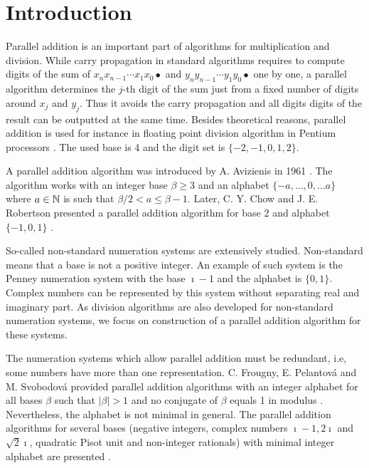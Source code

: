 \cleardoublepage{}
{}
\chapter*{Introduction}

Parallel addition  is an important part of algorithms for multiplication and division. 
While carry propagation in standard algorithms requires to compute digits of the sum of $x_n x_{n-1}\cdots x_1 x_0 \bullet$ and $y_n y_{n-1}\cdots y_1 y_0 \bullet$  one by one, a parallel algorithm determines the $j$-th digit of the sum just from a fixed number of digits around $x_j$ and $y_j$. Thus it avoids the carry propagation  and all digits digits of the result can be outputted at the same time. Besides theoretical reasons, parallel addition is used for instance in floating point division algorithm in Pentium processors \cite{division}. The used base is 4 and the digit set is $\{-2,-1,0,1,2\}$.

A parallel addition algorithm  was introduced by A. Avizienis in 1961 \cite{avizienis}. The algorithm works with an integer base $\beta\geq3$ and an alphabet $\{-a, \dots, 0, \dots a\}$ where $a\in\mathbb{N}$ is such that $\beta/2 <a \leq \beta-1$. Later, C. Y. Chow and J. E. Robertson presented a parallel addition algorithm for  base 2 and alphabet $\{-1,0,1\}$ \cite{chow}.

So-called non-standard numeration systems are extensively studied. Non-standard means that a base is not a positive integer. An example of such system is the Penney numeration system with the base $\imath-1$ and the alphabet is $\{0,1\}$. Complex numbers can be represented by this system without separating real and imaginary part. As division algorithms are also developed for non-standard numeration systems, we focus on construction of a parallel addition algorithm for these systems.

The numeration systems which allow parallel addition must be redundant, i.e, some numbers have more than one representation. 
C. Frougny, E. Pelantov\'a and M. Svobodov\'a provided parallel addition algorithms with an integer alphabet for all bases $\beta$ such that $|\beta|>1$ and no conjugate of $\beta$ equals 1 in modulus \cite{parAddNS}. Nevertheless, the alphabet is not minimal in general.
 The parallel addition algorithms for several bases (negative integers, complex numbers $\imath-1, 2\imath$ and $\sqrt{2}\imath$, quadratic Pisot unit and  non-integer rationals) with minimal integer alphabet are presented \cite{minAlph}.
 
